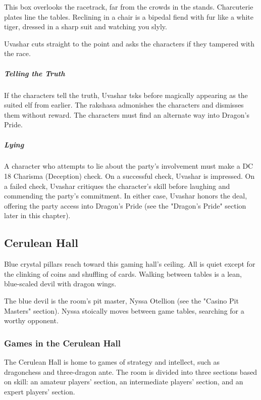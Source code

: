 \documentclass[10pt,a4paper,twoside,bg=print,twocolumn,openany,nodeprecatedcode]{dndbook}
\begin{document}
\begin{DndReadAloud}{}
This box overlooks the racetrack, far from the crowds in the stands. Charcuterie plates line the tables. Reclining in a chair is a bipedal fiend with fur like a white tiger, dressed in a sharp suit and watching you slyly.

\end{DndReadAloud}

Uvashar cuts straight to the point and asks the characters if they tampered with the race.

\subparagraph{Telling the Truth}
If the characters tell the truth, Uvashar tsks before magically appearing as the suited elf from earlier. The rakshasa admonishes the characters and dismisses them without reward. The characters must find an alternate way into Dragon's Pride.

\subparagraph{Lying}
A character who attempts to lie about the party's involvement must make a DC 18 Charisma (Deception) check. On a successful check, Uvashar is impressed. On a failed check, Uvashar critiques the character's skill before laughing and commending the party's commitment. In either case, Uvashar honors the deal, offering the party access into Dragon's Pride (see the "Dragon's Pride" section later in this chapter).

\subsection{Cerulean Hall}
\begin{DndReadAloud}{}
Blue crystal pillars reach toward this gaming hall's ceiling. All is quiet except for the clinking of coins and shuffling of cards. Walking between tables is a lean, blue-scaled devil with dragon wings.

\end{DndReadAloud}

The blue devil is the room's pit master, Nyssa Otellion (see the "Casino Pit Masters" section). Nyssa stoically moves between game tables, searching for a worthy opponent.

\subsubsection{Games in the Cerulean Hall}
The Cerulean Hall is home to games of strategy and intellect, such as dragonchess and three-dragon ante. The room is divided into three sections based on skill: an amateur players' section, an intermediate players' section, and an expert players' section.
\end{document}
